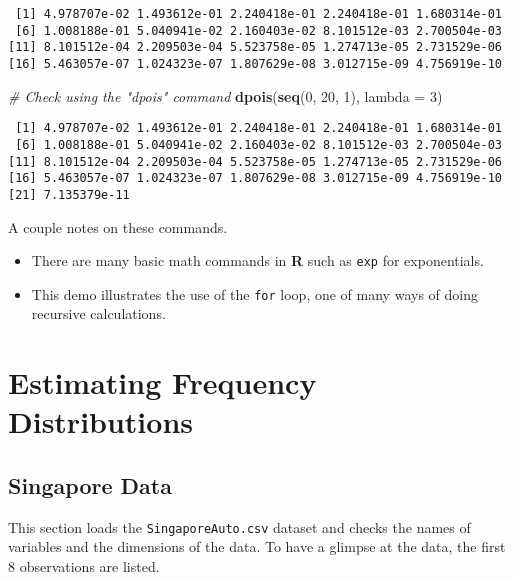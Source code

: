 \documentclass[]{book}
\newenvironment{Shaded}{\begin{snugshade}}{\end{snugshade}}
\newcommand{\KeywordTok}[1]{\textcolor[rgb]{0.13,0.29,0.53}{\textbf{#1}}}
\newcommand{\DataTypeTok}[1]{\textcolor[rgb]{0.13,0.29,0.53}{#1}}
\newcommand{\DecValTok}[1]{\textcolor[rgb]{0.00,0.00,0.81}{#1}}
\newcommand{\CommentTok}[1]{\textcolor[rgb]{0.56,0.35,0.01}{\textit{#1}}}
\newcommand{\NormalTok}[1]{#1}
\providecommand{\tightlist}{%
  \setlength{\itemsep}{0pt}\setlength{\parskip}{0pt}}
\theoremstyle{definition}
\theoremstyle{definition}
\theoremstyle{definition}
\theoremstyle{remark}
\begin{document}
\begin{verbatim}
 [1] 4.978707e-02 1.493612e-01 2.240418e-01 2.240418e-01 1.680314e-01
 [6] 1.008188e-01 5.040941e-02 2.160403e-02 8.101512e-03 2.700504e-03
[11] 8.101512e-04 2.209503e-04 5.523758e-05 1.274713e-05 2.731529e-06
[16] 5.463057e-07 1.024323e-07 1.807629e-08 3.012715e-09 4.756919e-10
\end{verbatim}

\begin{Shaded}
\begin{Highlighting}[]
\CommentTok{# Check using the "dpois" command}
\KeywordTok{dpois}\NormalTok{(}\KeywordTok{seq}\NormalTok{(}\DecValTok{0}\NormalTok{, }\DecValTok{20}\NormalTok{, }\DecValTok{1}\NormalTok{), }\DataTypeTok{lambda =} \DecValTok{3}\NormalTok{)}
\end{Highlighting}
\end{Shaded}

\begin{verbatim}
 [1] 4.978707e-02 1.493612e-01 2.240418e-01 2.240418e-01 1.680314e-01
 [6] 1.008188e-01 5.040941e-02 2.160403e-02 8.101512e-03 2.700504e-03
[11] 8.101512e-04 2.209503e-04 5.523758e-05 1.274713e-05 2.731529e-06
[16] 5.463057e-07 1.024323e-07 1.807629e-08 3.012715e-09 4.756919e-10
[21] 7.135379e-11
\end{verbatim}

A couple notes on these commands.

\begin{itemize}
\tightlist
\item
  There are many basic math commands in \textbf{R} such as \texttt{exp}
  for exponentials.
\item
  This demo illustrates the use of the \texttt{for} loop, one of many
  ways of doing recursive calculations.
\end{itemize}

\section{Estimating Frequency
Distributions}\label{estimating-frequency-distributions}

\subsection{Singapore Data}\label{singapore-data}

This section loads the \texttt{SingaporeAuto.csv} dataset and checks the
names of variables and the dimensions of the data. To have a glimpse at
the data, the first 8 observations are listed.
\end{document}
